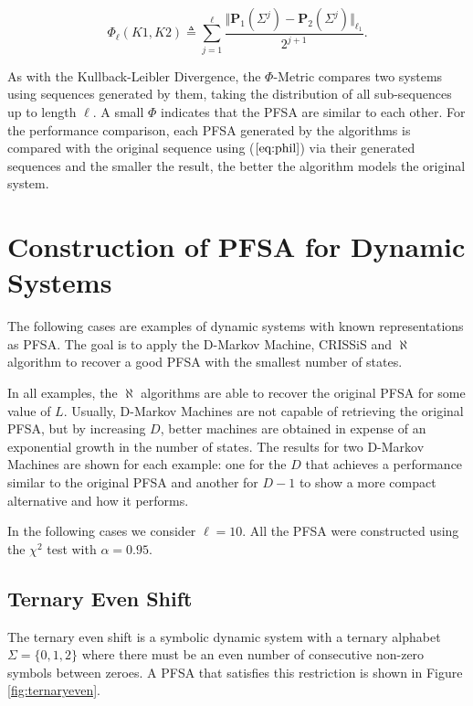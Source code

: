 {\begin{equation}
\Phi_{\ell}(K1, K2) \triangleq \sum_{j = 1}^{\ell} \frac{\Vert\textbf{P}_1(\Sigma^j)-\textbf{P}_2(\Sigma^j)\Vert_{\ell_1}}{2^{j + 1}}.\label{eq:phil}
\end{equation}

\noindent As with the Kullback-Leibler Divergence, the $\Phi$-Metric compares two systems using sequences generated by them, taking the distribution of all sub-sequences up to length $\ell$. A small $\Phi$ indicates that the PFSA are similar to each other. For the performance comparison, each PFSA generated by the algorithms is compared with the original sequence using ($\ref{eq:phil}$) via their generated sequences and the smaller the result, the better the algorithm models the original system.

\section{Construction of PFSA for Dynamic Systems}\label{sec:testcases}

The following cases are examples of dynamic systems with known representations as PFSA. The goal is to apply the D-Markov Machine, CRISSiS and $\aleph$  algorithm to recover a good PFSA with the smallest number of states.

In all examples, the $\aleph$ algorithms are able to recover the original PFSA for some value of $L$.  Usually, D-Markov Machines are not capable of retrieving the original PFSA, but by increasing $D$, better machines are obtained in expense of an exponential growth in the number of states. The results for two D-Markov Machines are shown for each example: one for the $D$ that achieves a performance similar to the original PFSA and another for $D-1$ to show a more compact alternative and how it performs.

In the following cases we consider $\ell=10$. All the PFSA were constructed using the $\chi^2$ test with $\alpha = 0.95$.

\subsection{Ternary Even Shift}

The ternary even shift is a symbolic dynamic system with a ternary alphabet $\Sigma = \{0,1,2\}$ where there must be an even number of consecutive non-zero symbols between zeroes. A PFSA that satisfies this restriction is shown in Figure \ref{fig:ternaryeven}. 

}
